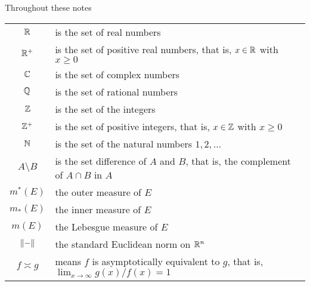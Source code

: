 Throughout these notes

\begin{tabular}{cl}
  $\mathbb{R}$ & is the set of real numbers\\
  $\mathbb{R}^+$ & is the set of positive real numbers, that is, $x\in\mathbb{R}$ with
             $x\geq 0$\\
  $\mathbb{C}$ & is the set of complex numbers\\
  $\mathbb{Q}$ & is the set of rational numbers\\
  $\mathbb{Z}$ & is the set of the integers\\
  $\mathbb{Z}^+$ & is the set of positive integers, that is, $x\in\mathbb{Z}$ with
             $x\geq 0$\\
  $\mathbb{N}$ & is the set of the natural numbers $1,2,\ldots$\\
  $A\setminus B$ & is the set difference of $A$ and $B$, that is, the
                        complement of $A\cap B$ in $A$\\
  $m^*(E)$ & the outer measure of $E$\\
  $m_*(E)$ & the inner measure of $E$\\
  $m(E)$ & the Lebesgue measure of $E$\\
  $\|{-}\|$ & the standard Euclidean norm on $\mathbb{R}^n$\\
  $f\asymp g$ & means $f$ is asymptotically equivalent to $g$, that is,
                $\lim_{x\to\infty} g(x)/f(x)=1$\\
\end{tabular}

\newpage

